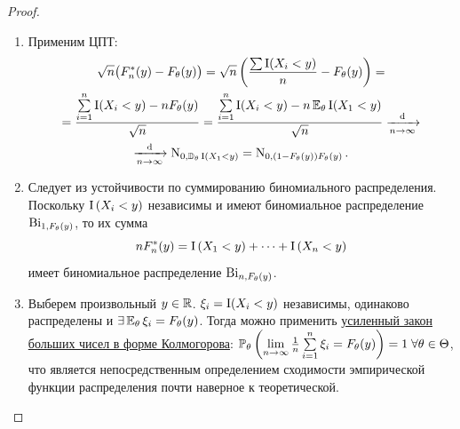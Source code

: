 \begin{proof}
\begin{enumerate}
\begin{enumerate}[label={\arabic*)}]
                \item Случайные величины $\Ind(X_{i}<y)$ независимы и одинаково распределены, поэтому:
                \begin{multline*}
                    \VarTh F_{n}^{*}(y)
                    = \VarTh \, \frac{\sum\limits_{i=1}^{n} \Ind(X_{i}<y)}{n}
                    = \frac{\sum\limits_{i=1}^{n} \VarTh \Ind(X_{i}<y)}{n^{2}}
                    = \\
                    = \frac{n\VarTh \Ind(X_{1}<y)}{n^{2}}
                    = \frac{F_{\theta}(y)\bigl(1-F_{\theta}(y)\bigr)}{n}
                \end{multline*}
                Значения $F_{\theta}(y)$ принадлежат отрезку $[0, 1]$, а значит, произведение $F_{\theta}(y)\bigl(1 - F_{\theta}(y)\bigr) \leqslant \frac{1}{2}\cdot\left(1 - \frac{1}{2}\right) = \frac{1}{4}~$ (нетрудно убедиться, что 1/2~--- точка максимума). 
                А значит, $\VarTh F_{n}^{*}(y) \leqslant \frac{1}{4n}\,$. 
            \end{enumerate}
        \item 
            Применим ЦПТ:
            \begin{multline*}
                \sqrt{n}\bigl( F_{n}^{*}(y)-F_{\theta}(y) \bigr)
                = \sqrt{n}\left(\frac{\sum \operatorname{\mathrm{I}}(X_{i}<y)}{n}-F_{\theta}(y)\right) 
                = \\
                = \frac{\sum\limits_{i=1}^{n} \operatorname{\mathrm{I}}(X_{i}<y)-n F_{\theta}(y)}{\sqrt{n}} 
                = \frac{\sum\limits_{i=1}^{n} \operatorname{\mathrm{I}}(X_{i}<y)-n \operatorname{\operatorname{\mathbb{E}}_{\theta}}\operatorname{\mathrm{I}}(X_{1}<y)}{\sqrt{n}} 
                \xrightarrow[n \to \infty]{\text{d}} \\
                \xrightarrow[n \to \infty]{\text{d}} \operatorname{\mathrm{N}}_{0, \operatorname{\mathbb{D}_{\theta}}\operatorname{\mathrm{I}}(X_{1}<y)}
                = \operatorname{\mathrm{N}}_{0, (1-F_{\theta}(y))F_{\theta}(y)}.
            \end{multline*}
        \item 
            Следует из устойчивости по суммированию биномиального распределения. 
            Поскольку $\operatorname{\mathrm{I}}\left(X_{i}<y\right)$ независимы и имеют биномиальное распределение $\operatorname{\mathrm{Bi}}_{1, F_{\theta}(y)}$, то их сумма
            \begin{equation*}
                n F_{n}^{*}(y)=\operatorname{\mathrm{I}}\left(X_{1}<y\right)+\cdots+\operatorname{\mathrm{I}}\left(X_{n}<y\right)
            \end{equation*}
            имеет биномиальное распределение $\operatorname{\mathrm{Bi}}_{n, F_{\theta}(y)}$.
            
        \item
            Выберем произвольный $y \in \mathbb{R}$.
            $\xi_i = \operatorname{\mathrm{I}}(X_i < y)$ независимы, одинаково распределены и $\exists \operatorname{\operatorname{\mathbb{E}}_{\theta}} \xi_i = F_{\theta}(y)$.
            Тогда можно применить \hyperlink{SLLN}{усиленный закон больших чисел в форме Колмогорова}: ${\operatorname{\operatorname{\mathbb{P}}_{\theta}}\left(\lim\limits_{n \to \infty} \frac{1}{n} \sum\limits_{i = 1}^{n}\xi_i = F_{\theta}(y)\right) = 1} \; \forall \theta \in \Theta$, что является непосредственным определением сходимости эмпирической функции распределения почти наверное к теоретической.
            \qedhere
    \end{enumerate}
\end{proof}
